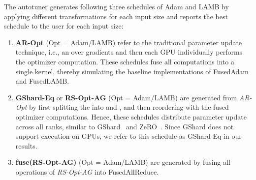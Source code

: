 The autotuner generates following three schedules of Adam and LAMB by applying different \tool transformations for each input size and reports the best schedule to the user for each input size:
\begin{enumerate}[leftmargin=*,topsep=2pt]
  \item \textbf{AR-Opt} (Opt = Adam/LAMB) refer to the traditional parameter update technique, i.e., an \allreduce over gradients  and then each GPU individually performs the optimizer computation. These schedules fuse all computations into a single kernel, thereby simulating the baseline implementations of FusedAdam and FusedLAMB.
  \item \textbf{GShard-Eq} or \textbf{RS-Opt-AG} (Opt = Adam/LAMB) are generated from \textit{AR-Opt} by first splitting the \allreduce into \reducescatter and \allgather, and then reordering \allgather with the fused optimizer computations.
  Hence, these schedules distribute parameter update across all ranks, similar to GShard~\cite{gshard} and ZeRO~\cite{zero}. Since GShard does not support execution on GPUs, we refer to this schedule as GShard-Eq in our results. 
  \item \textbf{fuse(RS-Opt-AG)} (Opt = Adam/LAMB) are generated by fusing all operations of \textit{RS-Opt-AG} into FusedAllReduce.
\end{enumerate}

